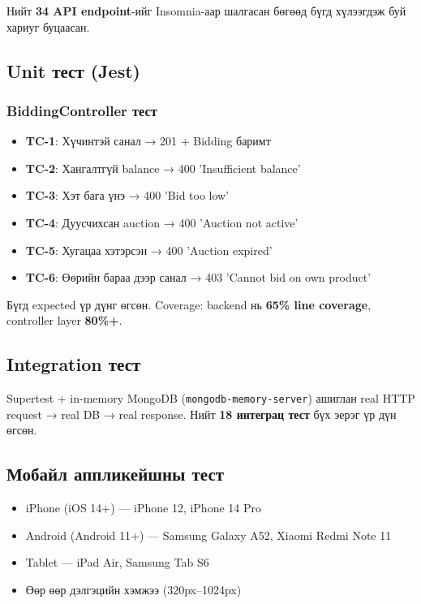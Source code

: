 \documentclass[12pt, a4paper]{report}
\begin{document}
Нийт \textbf{34 API endpoint}-ийг Insomnia-аар шалгасан бөгөөд бүгд хүлээгдэж буй хариуг буцаасан.

\subsection{Unit тест (Jest)}

\subsubsection{BiddingController тест}

\begin{itemize}
  \item \textbf{TC-1}: Хүчинтэй санал → 201 + Bidding баримт
  \item \textbf{TC-2}: Хангалтгүй balance → 400 'Insufficient balance'
  \item \textbf{TC-3}: Хэт бага үнэ → 400 'Bid too low'
  \item \textbf{TC-4}: Дуусчихсан auction → 400 'Auction not active'
  \item \textbf{TC-5}: Хугацаа хэтэрсэн → 400 'Auction expired'
  \item \textbf{TC-6}: Өөрийн бараа дээр санал → 403 'Cannot bid on own product'
\end{itemize}

Бүгд expected үр дүнг өгсөн. Coverage: backend нь \textbf{65\% line coverage}, controller layer \textbf{80\%+}.

\subsection{Integration тест}

Supertest + in-memory MongoDB (\texttt{mongodb-memory-server}) ашиглан real HTTP request → real DB → real response. Нийт \textbf{18 интеграц тест} бүх эерэг үр дүн өгсөн.

\subsection{Мобайл аппликейшны тест}

\begin{itemize}
  \item iPhone (iOS 14+) — iPhone 12, iPhone 14 Pro
  \item Android (Android 11+) — Samsung Galaxy A52, Xiaomi Redmi Note 11
  \item Tablet — iPad Air, Samsung Tab S6
  \item Өөр өөр дэлгэцийн хэмжээ (320px--1024px)
\end{itemize}
\end{document}
